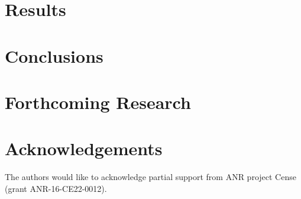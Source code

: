 \documentclass[a0,portrait,20pt]{a0poster}
\begin{document}
\begin{multicols}{2}
\color{DarkSlateGray}


\color{SaddleBrown}


\color{DarkSlateGray} %

\section*{}


\section*{Results}



\color{SaddleBrown} %

\section*{Conclusions}



\color{DarkSlateGray} %


\section*{Forthcoming Research}




\section*{Acknowledgements}


The authors would like to acknowledge partial support from ANR project Cense (grant ANR-16-CE22-0012).


\end{multicols}
\end{document}
